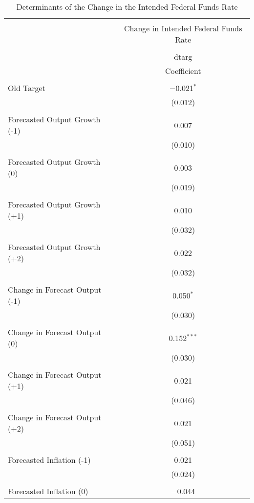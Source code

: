 
\begin{table}[!htbp] \centering 
  \caption{Determinants of the Change in the Intended Federal Funds Rate} 
  \label{} 
\begin{tabular}{@{\extracolsep{5pt}}lc} 
\\[-1.8ex]\hline 
\hline \\[-1.8ex] 
 & \multicolumn{1}{c}{Change in Intended Federal Funds Rate} \\ 
\cline{2-2} 
\\[-1.8ex] & dtarg \\ 
 & Coefficient \\ 
\hline \\[-1.8ex] 
 Old Target & $-$0.021$^{*}$ \\ 
  & (0.012) \\ 
  & \\ 
 Forecasted Output Growth (-1) & 0.007 \\ 
  & (0.010) \\ 
  & \\ 
 Forecasted Output Growth (0) & 0.003 \\ 
  & (0.019) \\ 
  & \\ 
 Forecasted Output Growth (+1) & 0.010 \\ 
  & (0.032) \\ 
  & \\ 
 Forecasted Output Growth (+2) & 0.022 \\ 
  & (0.032) \\ 
  & \\ 
 Change in Forecast Output (-1) & 0.050$^{*}$ \\ 
  & (0.030) \\ 
  & \\ 
 Change in Forecast Output (0) & 0.152$^{***}$ \\ 
  & (0.030) \\ 
  & \\ 
 Change in Forecast Output (+1) & 0.021 \\ 
  & (0.046) \\ 
  & \\ 
 Change in Forecast Output (+2) & 0.021 \\ 
  & (0.051) \\ 
  & \\ 
 Forecasted Inflation (-1) & 0.021 \\ 
  & (0.024) \\ 
  & \\ 
 Forecasted Inflation (0) & $-$0.044 \\ 

\end{tabular}
\end{table}
